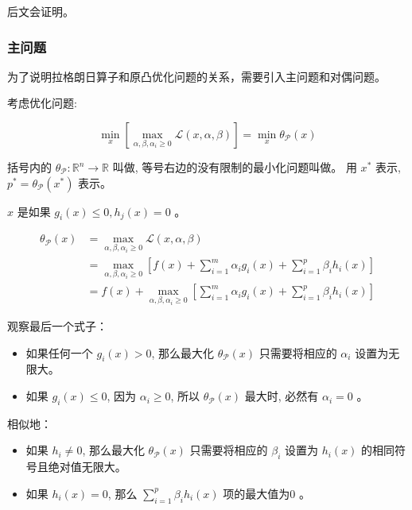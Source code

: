 后文会证明。

\subsubsection{主问题}

为了说明拉格朗日算子和原凸优化问题的关系，需要引入主问题和对偶问题。

考虑优化问题:

\begin{problem}
    \label{pbl:primal}
    $$
\min _{x}\left[\max _{\alpha, \beta, \alpha_{i} \geqslant 0} \mathcal{L}(x, \alpha, \beta)\right]=\min _{x} \theta_{\mathcal{P}}(x)
$$

括号内的 $ \theta_{\mathcal{P}}: \mathbb{R}^{n} \rightarrow \mathbb{R} $ 叫做, 等号右边的没有限制的最小化问题叫做。 用 $ x^{*} $ 表示,$ p^{*}=\theta_{\mathcal{P}}\left(x^{*}\right) $ 表示。
\end{problem}

\begin{definition}
    $ x $ 是如果 $ g_{i}(x) \leqslant 0, h_{j}(x)=0 $ 。
\end{definition}


$$
\begin{aligned}
\theta_{\mathcal{P}}(x) &=\max _{\alpha, \beta, \alpha_{i} \geqslant 0} \mathcal{L}(x, \alpha, \beta) \\
&=\max _{\alpha, \beta, \alpha_{i} \geqslant 0}\left[f(x)+\sum_{i=1}^{m} \alpha_{i} g_{i}(x)+\sum_{i=1}^{p} \beta_{i} h_{i}(x)\right] \\
&=f(x)+\max _{\alpha, \beta, \alpha_{i} \geqslant 0}\left[\sum_{i=1}^{m} \alpha_{i} g_{i}(x)+\sum_{i=1}^{p} \beta_{i} h_{i}(x)\right]
\end{aligned}
$$

观察最后一个式子：

\begin{itemize}
    \item 如果任何一个 $ g_{i}(x)>0 $, 那么最大化 $ \theta_{\mathcal{P}}(x) $ 只需要将相应的 $ \alpha_{i} $ 设置为无限大。
    \item 如果 $ g_{i}(x) \leqslant 0 $, 因为 $ \alpha_{i} \geqslant 0 $, 所以 $ \theta_{\mathcal{P}}(x) $ 最大时, 必然有 $ \alpha_{i}=0 $ 。
\end{itemize}

相似地：

\begin{itemize}
    \item 如果 $ h_{i} \neq 0 $, 那么最大化 $ \theta_{\mathcal{P}}(x) $ 只需要将相应的 $ \beta_{i} $ 设置为 $ h_{i}(x) $ 的相同符号且绝对值无限大。
    \item 如果 $ h_{i}(x)=0 $, 那么 $ \sum_{i=1}^{p} \beta_{i} h_{i}(x) $ 项的最大值为0 。
\end{itemize}

